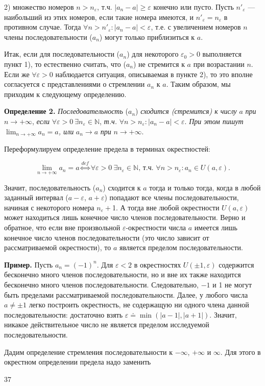 \documentclass[12pt, legalpaper]{article}
\begin{document}
2) множество номеров $n > n_{\varepsilon}$, т.ч. $|a_n - a| \ge \varepsilon$ конечно или пусто.
Пусть $n'_{\varepsilon}$ --- наибольший из этих номеров, если такие номера имеются, 
и $n'_{\varepsilon} = n_{\varepsilon}$ в противном случае. 
Тогда $\forall n > n'_{\varepsilon}:|a_n - a| < \varepsilon$, т.е. с увеличением номеров $n$ члены 
последовательности ($a_n$) могут только приблизиться к $a$.

Итак, если для последовательности ($a_n$) для некоторого $\varepsilon_0 > 0$ выполняется пункт 1), 
то естественно считать, что ($a_n$) не стремится к $a$ при возрастании $n$. 
Если же $\forall\varepsilon > 0$ 
наблюдается ситуация, описываемая в пункте 2), то это вполне согласуется с представлениями 
о стремлении $a_n$ к $a$. Таким образом, мы приходим к следующему определению.

\textbf{Определение 2.} \textit{Последовательность} ($a_n$) \textit{сходится (стремится) к числу} $a$ \textit{при} $n \to +\infty$,
\textit{если} $\forall\varepsilon > 0\ \exists n_{\varepsilon} \in \mathbb N$, \textit{т.ч.} $\forall n > n_{\varepsilon}:|a_n - a| < \varepsilon$.
\textit{При этом пишут} $\lim_{n\to+\infty} a_n = a$\textit{, или} $a_n \to a$ \textit{при} $n \to +\infty$.

Переформулируем определение предела в терминах окрестностей:

\begin{center}
	$$
	\lim_{n\to+\infty} a_n=a \stackrel{def}{\Leftrightarrow} \forall\varepsilon>0\ \exists n_{\varepsilon} \in \mathbb N\mbox{, т.ч. }\forall n > n_{\varepsilon}:a_n \in U(a, \varepsilon).
	$$
\end{center}

Значит, последовательность ($a_n$) сходится к $a$ тогда и только тогда, когда в любой заданный интервал 
($a - \varepsilon$, $a + \varepsilon$) попадают все члены последовательности, 
начиная с некоторого номера $n_{\varepsilon}+$1. А тогда вне 
любой окрестности $U(a, \varepsilon)$ может находиться лишь конечное число 
членов последовательности. Верно и обратное, что если вне произвольной 
$\varepsilon$-окрестности числа $a$ имеется лишь конечное число членов 
последовательности (это число зависит от рассматриваемой окрестности), 
то $a$ является пределом последовательности.

\textbf{Пример.} Пусть $a_n = (-1)^{n}$. Для $\varepsilon < 2$ в окрестностях 
$U(\pm1,\varepsilon)$ содержится бесконечно много членов последовательности, 
но и вне их также находится бесконечно много членов последовательности. 
Следовательно, $-1$ и 1 не могут быть пределами рассматриваемой последовательности. Далее, 
у любого числа $a \ne \pm1$ легко построить окрестность, не содержащую ни одного члена данной 
последовательности: достаточно взять $\varepsilon \doteq \min(|a - 1|, |a + 1|)$. 
Значит, никакое действительное число не является пределом исследуемой последовательности.

Дадим определение стремления последовательности к $-\infty$, $+\infty$ и $\infty$. 
Для этого в окрестном определении предела надо заменить



\begin{center}
	37
\end{center}
\end{document}
